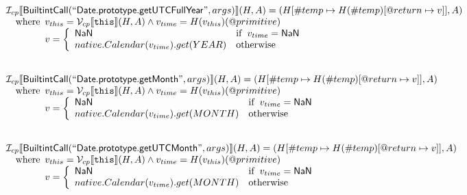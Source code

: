 \documentclass{article}
\newcommand{\SF}[1]{\mbox{\textsf{#1}}}
\newcommand{\TT}[1]{\mbox{\texttt{#1}}}
\newcommand{\wherec}[1]{{\rm where}\begin{array}[t]{l}#1\end{array}}
\newcommand{\ifc}[1]{{\rm if}\begin{array}[t]{l}#1\end{array}}
\newcommand{\owc}{{\rm otherwise}}
\newcommand{\I}{\mathcal{I}}
\newcommand{\V}{\mathcal{V}}
\newcommand{\lbr}{\llbracket}
\newcommand{\rbr}{\rrbracket}
\begin{document}
\[\begin{array}{l}
\I _{cp}\lbr \SF{BuiltintCall}(``\SF{Date.prototype.getUTCFullYear}",args)\rbr(H,A)
  = (H[\#temp \mapsto H(\#temp)[@return \mapsto v]], A)\\
\quad\wherec{
  v_{this} = \V _{cp}\lbr \TT{this}\rbr (H,A) \land v_{time} = H(v_{this})(@primitive)\\
  v = \left\{\begin{array}{ll}
    \SF{NaN}  & \ifc{v_{time} = \SF{NaN}}\\
    native.Calendar(v_{time}).get(YEAR) & \owc
    \end{array}\right.
  }\\
\\\\

\I _{cp}\lbr \SF{BuiltintCall}(``\SF{Date.prototype.getMonth}",args)\rbr(H,A)
  = (H[\#temp \mapsto H(\#temp)[@return \mapsto v]], A)\\
\quad\wherec{
  v_{this} = \V _{cp}\lbr \TT{this}\rbr (H,A) \land v_{time} = H(v_{this})(@primitive)\\
  v = \left\{\begin{array}{ll}
    \SF{NaN}  & \ifc{v_{time} = \SF{NaN}}\\
    native.Calendar(v_{time}).get(MONTH) & \owc
    \end{array}\right.
  }\\
\\\\

\I _{cp}\lbr \SF{BuiltintCall}(``\SF{Date.prototype.getUTCMonth}",args)\rbr(H,A)
  = (H[\#temp \mapsto H(\#temp)[@return \mapsto v]], A)\\
\quad\wherec{
  v_{this} = \V _{cp}\lbr \TT{this}\rbr (H,A) \land v_{time} = H(v_{this})(@primitive)\\
  v = \left\{\begin{array}{ll}
    \SF{NaN}  & \ifc{v_{time} = \SF{NaN}}\\
    native.Calendar(v_{time}).get(MONTH) & \owc
    \end{array}\right.
  }\\
\\\\
\end{array}
\]
\end{document}
